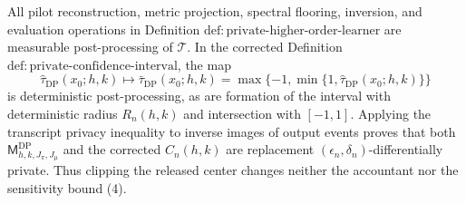 All pilot reconstruction, metric projection, spectral flooring, inversion, and evaluation operations in Definition \(\mathrm{def{:}private\text{-}higher\text{-}order\text{-}learner}\) are measurable post-processing of \(\mathcal T\).  In the corrected Definition \(\mathrm{def{:}private\text{-}confidence\text{-}interval}\), the map
\[
 \widehat\tau_{\mathrm{DP}}(x_0;h,k)
 \longmapsto
 \bar\tau_{\mathrm{DP}}(x_0;h,k)
 =\max\{-1,\min\{1,\widehat\tau_{\mathrm{DP}}(x_0;h,k)\}\}
\]
is deterministic post-processing, as are formation of the interval with deterministic radius \(R_n(h,k)\) and intersection with \([-1,1]\).  Applying the transcript privacy inequality to inverse images of output events proves that both \(\mathsf M_{h,k,J_\pi,J_\mu}^{\mathrm{DP}}\) and the corrected \(C_n(h,k)\) are replacement \((\epsilon_n,\delta_n)\)-differentially private.  Thus clipping the released center changes neither the accountant nor the sensitivity bound (4).
